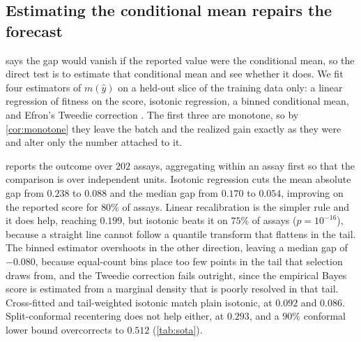\documentclass{article}
\theoremstyle{plain}
\theoremstyle{definition}
\newcommand{\yhat}{\hat{y}}
\begin{document}
\subsection{Estimating the conditional mean repairs the forecast}
\label{sec:results-condmean}

 says the gap would vanish if the reported value were the conditional
mean, so the direct test is to estimate that conditional mean and see whether it does.
We fit four estimators of $m(\yhat)$ on a held-out slice of the training data only: a
linear regression of fitness on the score, isotonic regression, a binned conditional
mean, and Efron's Tweedie correction \citep{efron2011tweedie}. The first three are
monotone, so by \cref{cor:monotone} they leave the batch and the realized gain exactly
as they were and alter only the number attached to it.

 reports the outcome over $202$ assays, aggregating within an assay
first so that the comparison is over independent units. Isotonic regression cuts the
mean absolute gap from $0.238$ to $0.088$ and the median gap from $0.170$ to $0.054$,
improving on the reported score for $80\%$ of assays. Linear recalibration is the
simpler rule and it does help, reaching $0.199$, but isotonic beats it on $75\%$ of
assays ($p = 10^{-16}$), because a straight line cannot follow a quantile transform
that flattens in the tail. The binned estimator overshoots in the other direction,
leaving a median gap of $-0.080$, because equal-count bins place too few points in the
tail that selection draws from, and the Tweedie correction fails outright, since the
empirical Bayes score is estimated from a marginal density that is poorly resolved in
that tail. Cross-fitted and tail-weighted isotonic match plain isotonic, at $0.092$ and
$0.086$. Split-conformal recentering does not help either, at $0.293$, and a $90\%$
conformal lower bound overcorrects to $0.512$ (\cref{tab:sota}).
\end{document}
